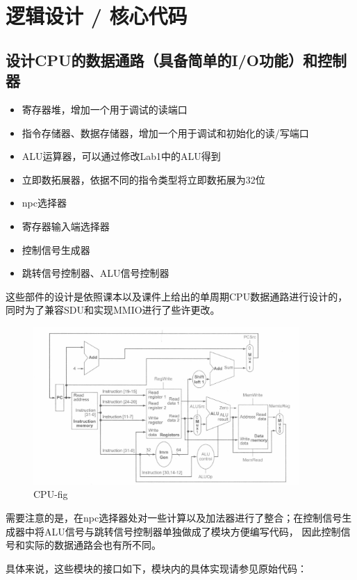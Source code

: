 \documentclass[a4paper]{article}
\begin{document}
\section{逻辑设计 / 核心代码}
\subsection{设计CPU的数据通路（具备简单的I/O功能）和控制器}
\begin{itemize}
    \item 寄存器堆，增加一个用于调试的读端口
    \item 指令存储器、数据存储器，增加一个用于调试和初始化的读/写端口
    \item ALU运算器，可以通过修改Lab1中的ALU得到
    \item 立即数拓展器，依据不同的指令类型将立即数拓展为32位
    \item npc选择器
    \item 寄存器输入端选择器
    \item 控制信号生成器
    \item 跳转信号控制器、ALU信号控制器
  \end{itemize}

这些部件的设计是依照课本以及课件上给出的单周期CPU数据通路进行设计的，同时为了兼容SDU和实现MMIO进行了些许更改。
\begin{figure}[H]
    \centering
    \includegraphics[width=0.9\textwidth]{1.png}
    \caption{CPU-fig}
    \label{fig:test1}
\end{figure}

需要注意的是，在npc选择器处对一些计算以及加法器进行了整合；在控制信号生成器中将ALU信号与跳转信号控制器单独做成了模块方便编写代码，
因此控制信号和实际的数据通路会也有所不同。

具体来说，这些模块的接口如下，模块内的具体实现请参见原始代码：
\end{document}
